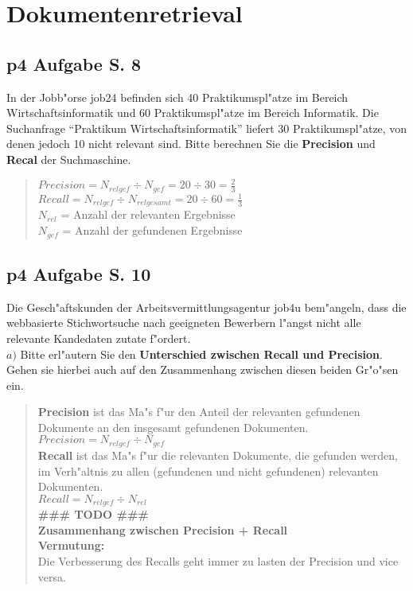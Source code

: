 \section{Dokumentenretrieval}

\subsection{p4 Aufgabe S. 8}

In der Jobb"orse job24 befinden sich 40 Praktikumspl"atze im Bereich Wirtschaftsinformatik und 60 Praktikumspl"atze im Bereich Informatik.
Die Suchanfrage "`Praktikum Wirtschaftsinformatik"' liefert 30 Praktikumspl"atze, von denen jedoch 10 nicht relevant sind.
Bitte berechnen Sie die \textbf{Precision} und \textbf{Recal} der Suchmaschine.\\

\begin{quote}
    $Precision = N_{relgef} \div N_{gef} = 20 \div 30 = \frac{2}{3}$\\
    $Recall = N_{relgef} \div N_{relgesamt} = 20 \div 60 = \frac{1}{3}$\\

    {\tiny $N_{rel}$ = Anzahl der relevanten Ergebnisse}\\
    {\tiny $N_{gef}$ = Anzahl der gefundenen Ergebnisse}
\end{quote}


\subsection{p4 Aufgabe S. 10}
Die Gesch"aftskunden der Arbeitsvermittlungsagentur job4u bem"angeln, dass die webbasierte Stichwortsuche nach geeigneten Bewerbern l"angst nicht alle relevante Kandedaten zutate f"ordert.\\

\noindent
$a)$ Bitte erl"autern Sie den \textbf{Unterschied zwischen Recall und Precision}.
Gehen sie hierbei auch auf den Zusammenhang zwischen diesen beiden Gr"o"sen ein.\\

\begin{quote}
    \textbf{Precision} ist das Ma"s f"ur den Anteil der relevanten gefundenen Dokumente an den insgesamt gefundenen Dokumenten.\\
    $Precision = N_{relgef} \div N_{gef}$\\

    \textbf{Recall} ist das Ma"s f"ur die relevanten Dokumente, die gefunden werden, im Verh"altnis zu allen (gefundenen und nicht gefundenen) relevanten Dokumenten.\\
    $Recall = N_{relgef} \div N_{rel}$\\


    \textbf{\#\#\# TODO \#\#\#\\Zusammenhang zwischen Precision + Recall}\\
    \textbf{Vermutung:}\\
    Die Verbesserung des Recalls geht immer zu lasten der Precision und vice versa.

\end{quote}

